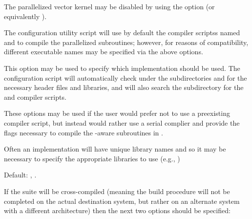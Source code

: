 \begin{config}
  
\item {}
  
  The parallelized vector kernel may be disabled by using the  option
  (or equivalently ).
  
\item {}
\item {}
  
  The configuration utility script will use by default the {\mpi} compiler scriptss named
   and  to compile the parallelized {\sundials} subroutines; 
  however, for reasons of compatibility, different executable names may be specified via the above options.

\item {}

  This option may be used to specify which {\mpi} implementation should be used.  
  The {\sundials} configuration script will automatically check under the subdirectories 
   and  for the necessary header files and libraries, and will also 
  search the subdirectory  for the {\C} and {\F} {\mpi} compiler scripts.
  
\item {}
\item {}
\item {}

  These options may be used if the user would prefer not to use a preexisting {\mpi} compiler script, 
  but instead would rather use a serial complier and provide the flags necessary to compile the {\mpi}-aware 
  subroutines in {\sundials}.

  Often an {\mpi} implementation will have unique library names and so it may be necessary to specify the 
  appropriate libraries to use (e.g., )

  Default: , .

\end{config}



\vspace{0.25in}
\noindent If the {\sundials} suite will be cross-compiled (meaning the build procedure will not be completed on the actual 
destination system, but rather on an alternate system with a different architecture) then the next two options should be specified:

